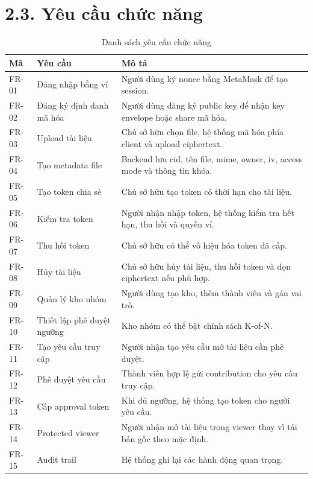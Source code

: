 \section*{2.3. Yêu cầu chức năng}
{}

\begin{longtable}{|p{2cm}|p{5cm}|p{7cm}|}
\caption{Danh sách yêu cầu chức năng} \\
\hline
\textbf{Mã} & \textbf{Yêu cầu} & \textbf{Mô tả} \\ \hline
FR-01 & Đăng nhập bằng ví & Người dùng ký nonce bằng MetaMask để tạo session. \\ \hline
FR-02 & Đăng ký định danh mã hóa & Người dùng đăng ký public key để nhận key envelope hoặc share mã hóa. \\ \hline
FR-03 & Upload tài liệu & Chủ sở hữu chọn file, hệ thống mã hóa phía client và upload ciphertext. \\ \hline
FR-04 & Tạo metadata file & Backend lưu cid, tên file, mime, owner, iv, access mode và thông tin khóa. \\ \hline
FR-05 & Tạo token chia sẻ & Chủ sở hữu tạo token có thời hạn cho tài liệu. \\ \hline
FR-06 & Kiểm tra token & Người nhận nhập token, hệ thống kiểm tra hết hạn, thu hồi và quyền ví. \\ \hline
FR-07 & Thu hồi token & Chủ sở hữu có thể vô hiệu hóa token đã cấp. \\ \hline
FR-08 & Hủy tài liệu & Chủ sở hữu hủy tài liệu, thu hồi token và dọn ciphertext nếu phù hợp. \\ \hline
FR-09 & Quản lý kho nhóm & Người dùng tạo kho, thêm thành viên và gán vai trò. \\ \hline
FR-10 & Thiết lập phê duyệt ngưỡng & Kho nhóm có thể bật chính sách K-of-N. \\ \hline
FR-11 & Tạo yêu cầu truy cập & Người nhận tạo yêu cầu mở tài liệu cần phê duyệt. \\ \hline
FR-12 & Phê duyệt yêu cầu & Thành viên hợp lệ gửi contribution cho yêu cầu truy cập. \\ \hline
FR-13 & Cấp approval token & Khi đủ ngưỡng, hệ thống tạo token cho người yêu cầu. \\ \hline
FR-14 & Protected viewer & Người nhận mở tài liệu trong viewer thay vì tải bản gốc theo mặc định. \\ \hline
FR-15 & Audit trail & Hệ thống ghi lại các hành động quan trọng. \\ \hline
\end{longtable}

